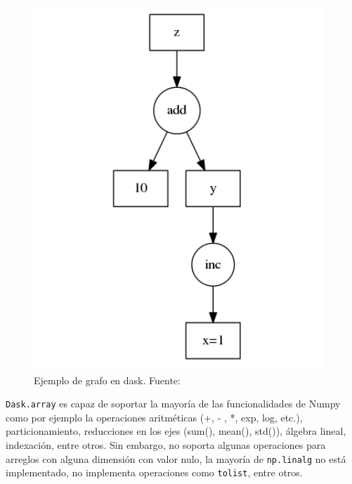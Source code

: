 \begin{figure}[!ht]
	\centering
	\captionsetup{justification=centering}
	\includegraphics[scale=0.6]{images/grafo_dask.png}
	\caption[Ejemplo de grafo en dask.]{Ejemplo de grafo en dask. Fuente: \citep{rocklin2015dask}}
	\label{fig:dask_graph}
\end{figure}

\verb|Dask.array| es capaz de soportar la mayoría de las funcionalidades de Numpy como por ejemplo la operaciones aritméticas (+, - , *, exp, log, etc.), particionamiento, reducciones en los ejes (sum(), mean(), std()), álgebra lineal, indexación, entre otros. Sin embargo, no soporta algunas operaciones para arreglos con alguna dimensión con valor nulo, la mayoría de \verb|np.linalg| no está implementado, no implementa operaciones como \verb|tolist|, entre otros.

\newpage
